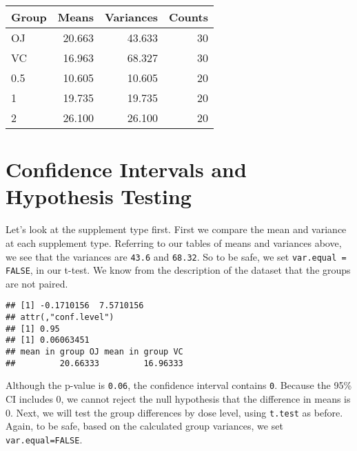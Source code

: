 \documentclass[]{article}
\newenvironment{Shaded}{\begin{snugshade}}{\end{snugshade}}
\newcommand{\KeywordTok}[1]{\textcolor[rgb]{0.13,0.29,0.53}{\textbf{{#1}}}}
\newcommand{\DataTypeTok}[1]{\textcolor[rgb]{0.13,0.29,0.53}{{#1}}}
\newcommand{\StringTok}[1]{\textcolor[rgb]{0.31,0.60,0.02}{{#1}}}
\newcommand{\OtherTok}[1]{\textcolor[rgb]{0.56,0.35,0.01}{{#1}}}
\newcommand{\NormalTok}[1]{{#1}}
\begin{document}
\begin{table}[ht]
\centering
\begin{tabular}{lrrr}
  \hline
Group & Means & Variances & Counts \\ 
  \hline
OJ & 20.663 & 43.633 &   30 \\ 
  VC & 16.963 & 68.327 &   30 \\ 
  0.5 & 10.605 & 10.605 &   20 \\ 
  1 & 19.735 & 19.735 &   20 \\ 
  2 & 26.100 & 26.100 &   20 \\ 
   \hline
\end{tabular}
\end{table}

\section{Confidence Intervals and Hypothesis
Testing}\label{confidence-intervals-and-hypothesis-testing}

Let's look at the supplement type first. First we compare the mean and
variance at each supplement type. Referring to our tables of means and
variances above, we see that the variances are \texttt{43.6} and
\texttt{68.32}. So to be safe, we set \texttt{var.equal = FALSE}, in our
t-test. We know from the description of the dataset that the groups are
not paired.

\begin{Shaded}
\end{Shaded}

\begin{verbatim}
## [1] -0.1710156  7.5710156
## attr(,"conf.level")
## [1] 0.95
## [1] 0.06063451
## mean in group OJ mean in group VC 
##         20.66333         16.96333
\end{verbatim}

Although the p-value is \texttt{0.06}, the confidence interval contains
\texttt{0}. Because the 95\% CI includes 0, we cannot reject the null
hypothesis that the difference in means is 0. Next, we will test the
group differences by dose level, using \texttt{t.test} as before. Again,
to be safe, based on the calculated group variances, we set
\texttt{var.equal=FALSE}.
\end{document}
